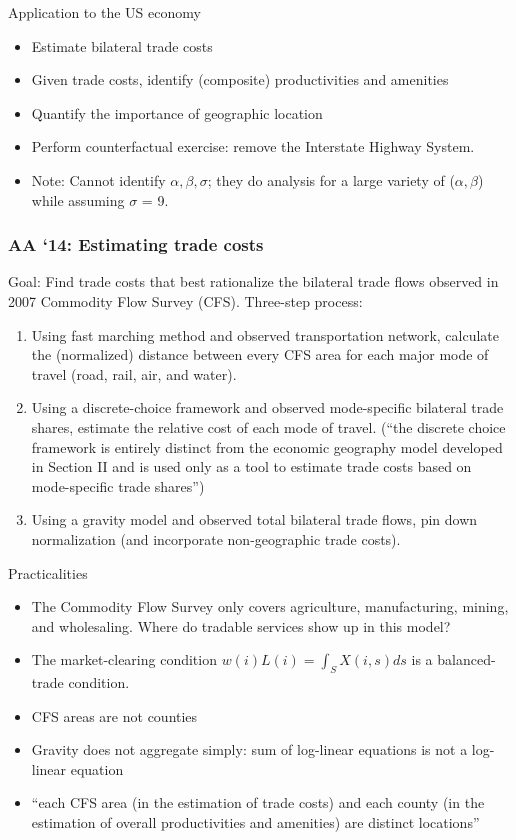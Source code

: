 \documentclass[11pt,notes=hide,aspectratio=169]{beamer}
\begin{document}
\begin{frame}{Application to the US economy}
\begin{itemize}
\item Estimate bilateral trade costs
\item Given trade costs, identify (composite) productivities and amenities 
\item Quantify the importance of geographic location
\item Perform counterfactual exercise: remove the Interstate Highway System.
\item Note: Cannot identify $\alpha, \beta, \sigma$; they do analysis for a large variety of ($\alpha, \beta$) while assuming $\sigma$ = 9.
\end{itemize}
\end{frame}
\begin{frame}
\frametitle{AA `14: Estimating trade costs}
Goal: Find trade costs that best rationalize the bilateral trade flows observed in 2007 Commodity Flow Survey (CFS).
Three-step process:
\begin{enumerate}
\item Using fast marching method and observed transportation network, calculate the (normalized) distance between every CFS area for each major mode of travel (road, rail, air, and water).
\item Using a discrete-choice framework and observed mode-specific bilateral trade shares, estimate the relative cost of each mode of travel.
(``the discrete choice framework is entirely distinct from the economic geography model developed in Section II and is used only as a tool to estimate trade costs based on mode-specific trade shares'')
\item Using a gravity model and observed total bilateral trade flows, pin down normalization (and incorporate non-geographic trade costs).
\end{enumerate}
\end{frame}
\begin{frame}{Practicalities}
\begin{itemize}
\item The Commodity Flow Survey only covers agriculture, manufacturing, mining, and wholesaling.
Where do tradable services show up in this model?
\item The market-clearing condition $w\left(i\right)L\left(i\right)=\int_{S}X\left(i,s\right)ds$ is a balanced-trade condition.
\item CFS areas are not counties
\item Gravity does not aggregate simply: sum of log-linear equations is not a log-linear equation
\item ``each CFS area (in the estimation of trade costs) and each county (in the estimation of overall productivities and amenities) are distinct locations''
\end{itemize}
\end{frame}
\end{document}
